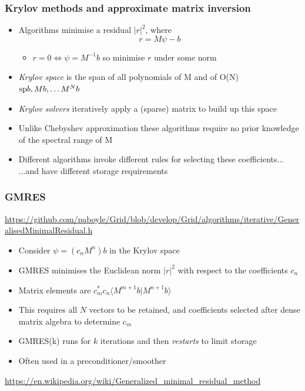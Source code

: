 \documentclass[pdf,ps,8pt]{beamer}
\newcommand{\link}[1]{\href{#1}{ {\color{blue} #1} }}
\begin{document}
  \begin{frame}[fragile]\small\frametitle{ Krylov methods and approximate matrix inversion}
  \begin{itemize}
  \item Algorithms minimise a residual $|r|^2$, where
    $$
    r = M \psi - b
    $$
  \begin{itemize}
  \item $r=0 \Leftrightarrow \psi = M^{-1} b$ so minimise $r$ under some norm
  \end{itemize}
  \item \emph{Krylov space} is the span of all polynomials of M and of O(N) $ {\rm sp} { b , M b, \ldots M^N b}$
  \item \emph{Krylov solvers} iteratively apply a (sparse) matrix to build up this space
  \item Unlike Chebyshev approximation these algorithms require no prior knowledge of the spectral range of M
  \item Different algorithms invoke different rules for selecting these coefficients...\\ ...and have different storage requirements
  \end{itemize}
  \end{frame}
  \begin{frame}[fragile]\small\frametitle{ GMRES}

    \link{https://github.com/paboyle/Grid/blob/develop/Grid/algorithms/iterative/GeneralisedMinimalResidual.h}
    
    \begin{itemize}
    \item Consider $\psi = (c_n M^n) b$ in the Krylov space
    \item GMRES minimises the Euclidean norm $|r|^2$ with respect to the coefficients $c_n$
    \item Matrix elements are $c_m^\ast c_n \langle M^{m+1} b |M^{n+1} b\rangle$
    \item This requires all $N$ vectors to be retained, and coefficients selected after dense matrix algebra to determine $c_m$
    \item GMRES(k) runs for $k$ iterations and then \emph{restarts} to limit storage
    \item Often used in a preconditioner/smoother
    \end{itemize}

    \href{https://en.wikipedia.org/wiki/Generalized_minimal_residual_method}{{\color{blue}https://en.wikipedia.org/wiki/Generalized\_minimal\_residual\_method}}

    
  \end{frame}
\end{document}

